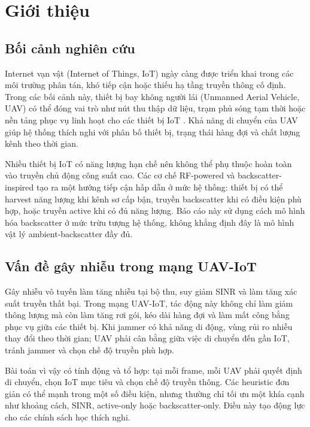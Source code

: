 \chapter{Giới thiệu}

\section{Bối cảnh nghiên cứu}

Internet vạn vật (Internet of Things, IoT) ngày càng được triển khai trong các môi trường phân tán, khó tiếp cận hoặc thiếu hạ tầng truyền thông cố định. Trong các bối cảnh này, thiết bị bay không người lái (Unmanned Aerial Vehicle, UAV) có thể đóng vai trò như nút thu thập dữ liệu, trạm phủ sóng tạm thời hoặc nền tảng phục vụ linh hoạt cho các thiết bị IoT \cite{uav_iot_survey_todo}. Khả năng di chuyển của UAV giúp hệ thống thích nghi với phân bố thiết bị, trạng thái hàng đợi và chất lượng kênh theo thời gian.

Nhiều thiết bị IoT có năng lượng hạn chế nên không thể phụ thuộc hoàn toàn vào truyền chủ động công suất cao. Các cơ chế RF-powered và backscatter-inspired tạo ra một hướng tiếp cận hấp dẫn ở mức hệ thống: thiết bị có thể harvest năng lượng khi kênh sơ cấp bận, truyền backscatter khi có điều kiện phù hợp, hoặc truyền active khi có đủ năng lượng. Báo cáo này sử dụng cách mô hình hóa backscatter ở mức trừu tượng hệ thống, không khẳng định đây là mô hình vật lý ambient-backscatter đầy đủ.

\section{Vấn đề gây nhiễu trong mạng UAV-IoT}

Gây nhiễu vô tuyến làm tăng nhiễu tại bộ thu, suy giảm SINR và làm tăng xác suất truyền thất bại. Trong mạng UAV-IoT, tác động này không chỉ làm giảm thông lượng mà còn làm tăng rơi gói, kéo dài hàng đợi và làm mất công bằng phục vụ giữa các thiết bị. Khi jammer có khả năng di động, vùng rủi ro nhiễu thay đổi theo thời gian; UAV phải cân bằng giữa việc di chuyển đến gần IoT, tránh jammer và chọn chế độ truyền phù hợp.

Bài toán vì vậy có tính động và tổ hợp: tại mỗi frame, mỗi UAV phải quyết định di chuyển, chọn IoT mục tiêu và chọn chế độ truyền thông. Các heuristic đơn giản có thể mạnh trong một số điều kiện, nhưng thường chỉ tối ưu một khía cạnh như khoảng cách, SINR, active-only hoặc backscatter-only. Điều này tạo động lực cho các chính sách học thích nghi.

